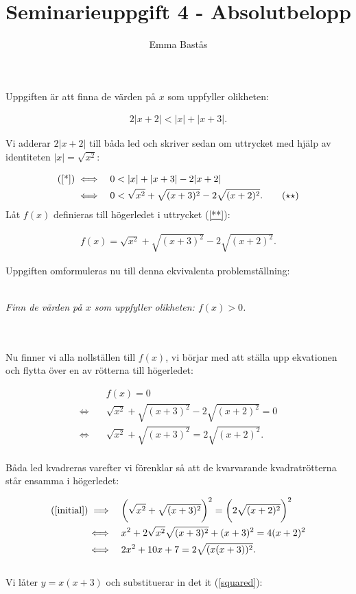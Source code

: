 \documentclass{article}
\title{Seminarieuppgift 4 - Absolutbelopp}
\author{Emma Bastås}
\begin{document}
\maketitle

\noindent Uppgiften är att finna de värden på $x$ som uppfyller olikheten:

\begin{gather*}
  2|x+2| < |x| + |x+3|\text{.} \label{*}\tag{$\star$}
\end{gather*}

\noindent Vi adderar $2|x+2|$ till båda led och skriver sedan om uttrycket med hjälp av identiteten $|x| = \sqrt{x^{2}}$:

\begin{align*}
  \text{(\ref{*})} \iff& \quad 0 < |x| + |x + 3| - 2|x+2| \\
  \iff& \quad 0 < \sqrt{x^{2}} + \sqrt{(x + 3)^{2}} - 2 \sqrt{(x + 2)^{2}}\text{.} \label{**}\tag{$\star\star$}
\end{align*}
\noindent Låt $f(x)$ definieras till högerledet i uttrycket (\ref{**}):

\begin{gather*}
  f(x) =  \sqrt{x^{2}} + \sqrt{(x + 3)^{2}} - 2 \sqrt{(x + 2)^{2}}\text{.}
\end{gather*}

\noindent Uppgiften omformuleras nu till denna ekvivalenta problemställning:
\\
\\
\centerline{\emph{Finn de värden på $x$ som uppfyller olikheten: $f(x) > 0$.}}
\\
\\
Nu finner vi alla nollställen till $f(x)$, vi börjar med att ställa upp ekvationen och flytta över en av rötterna till högerledet:

\begin{align}
  \quad & f(x) = 0 \nonumber\\
  \iff \quad &\sqrt{x^{2}} + \sqrt{(x + 3)^{2}} - 2 \sqrt{(x + 2)^{2}} = 0 \nonumber\\
  \iff \quad &\sqrt{x^{2}} + \sqrt{(x + 3)^{2}} = 2 \sqrt{(x + 2)^{2}}\text{.} \label{initial}
\end{align}
\\
Båda led kvadreras varefter vi förenklar så att de kvarvarande kvadratrötterna står ensamma i högerledet:

\begin{align}
  \text{(\ref{initial})} \implies \quad & \biggl(\sqrt{x^{2}} + \sqrt{(x + 3)^{2}}\biggr)^{2} = \biggl(2 \sqrt{(x + 2)^{2}}\biggr)^{2} \nonumber\\
  \iff \quad & x^{2} + 2\sqrt{x^{2}}\sqrt{(x+3)^{2}} + (x + 3)^{2} = 4(x+2)^{2} \nonumber\\
  \iff \quad & 2x^{2} + 10x + 7 = 2\sqrt{(x(x+3))^{2}}\text{.} \label{squared}
\end{align}
\\
Vi låter $y = x(x+3)$ och substituerar in det it (\ref{squared}):
\end{document}

